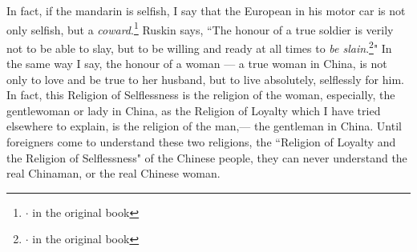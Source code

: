 In fact, if the mandarin is selfish, I say that the European in his motor car is not only selfish, but a \emph{coward}.\footnote{{\huge$\cdot$} in the original book}
Ruskin  says, ``The honour of a true soldier is verily not to be able to slay, but to be willing and ready at all times to \emph{be slain}.\footnote{{\huge$\cdot$} in the original book}"
In the same way I say, the honour of a woman --- a true woman in China, is not only to love and be true to her husband, but to live absolutely, selflessly for him.
In fact, this Religion of Selflessness is the religion of the woman, especially, the gentlewoman or lady in China, as the Religion of Loyalty which I have tried elsewhere to explain, is the religion of the man,--- the gentleman in China.
Until foreigners come to understand these two religions, the ``Religion of Loyalty and the Religion of Selflessness" of the Chinese people, they can never understand the real Chinaman, or the real Chinese woman.

